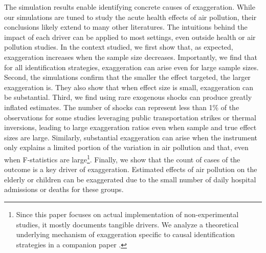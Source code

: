 \documentclass[12pt]{article}
\begin{document}
    The simulation results enable identifying concrete causes of exaggeration. While our simulations are tuned to study the acute health effects of air pollution, their conclusions likely extend to many other literatures. The intuitions behind the impact of each driver can be applied to most settings, even outside health or air pollution studies. In the context studied, we first show that, as expected, exaggeration increases when the sample size decreases. Importantly, we find that for all identification strategies, exaggeration can arise even for large sample sizes. Second, the simulations confirm that the smaller the effect targeted, the larger exaggeration is. They also show that when effect size is small, exaggeration can be substantial. Third, we find using rare exogenous shocks can produce greatly inflated estimates. The number of shocks can represent less than 1\% of the observations for some studies leveraging public transportation strikes or thermal inversions, leading to large exaggeration ratios even when sample and true effect sizes are large. Similarly, substantial exaggeration can arise when the instrument only explains a limited portion of the variation in air pollution and that, even when F-statistics are large\footnote{Since this paper focuses on actual implementation of non-experimental studies, it mostly documents tangible drivers. We analyze a theoretical underlying mechanism of exaggeration specific to causal identification strategies in a companion paper \citep{bagilet_causal_2023}.}.
    Finally, we show that the count of cases of the outcome is a key driver of exaggeration. Estimated effects of air pollution on the elderly or children can be exaggerated due to the small number of daily hospital admissions or deaths for these groups.

\end{document}

